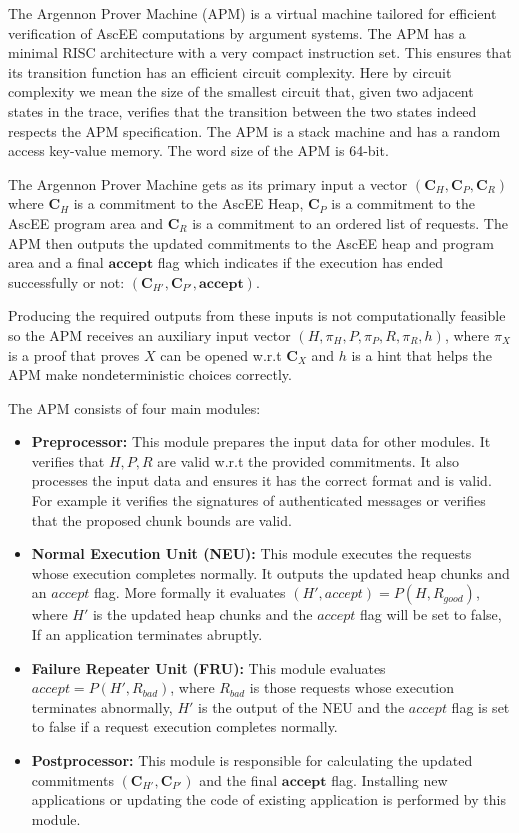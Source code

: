 
The Argennon Prover Machine (APM) is a virtual machine tailored for efficient verification of AscEE computations by
argument systems. The APM has a minimal RISC architecture with a very compact instruction set. This ensures that
its transition function has an efficient circuit complexity. Here by circuit complexity we mean the size
of the smallest circuit that, given two adjacent states in the trace, verifies that the transition between the two
states indeed respects the APM specification. The APM is a stack machine and has a random access key-value memory.
The word size of the APM is 64-bit.

The Argennon Prover Machine gets as its primary input a vector $(\mathbf{C}_H,\mathbf{C}_P,\mathbf{C}_R)$ where
$\mathbf{C}_H$ is a commitment to the AscEE Heap, $\mathbf{C}_P$ is a commitment to the AscEE program area and
$\mathbf{C}_R$ is a commitment to an ordered list of requests. The APM then outputs the updated
commitments to the AscEE heap and program area and a final $\mathbf{accept}$ flag which indicates if the execution has
ended successfully or not: $(\mathbf{C}_{H'},\mathbf{C}_{P'},\mathbf{accept})$.

Producing the required outputs from these inputs is not computationally feasible so the APM receives an auxiliary
input vector $(H,\pi_H,P,\pi_P,R,\pi_R,h)$, where $\pi_X$ is a proof that proves $X$ can be opened w.r.t
$\mathbf{C}_X$ and $h$ is a hint that helps the APM make nondeterministic choices correctly.

The APM consists of four main modules:
\begin{itemize}
    \item \textbf{Preprocessor:} This module prepares the input data for other modules. It verifies that $H,
    P,R$ are valid w.r.t the provided commitments. It also processes the input data and ensures it has the
    correct format and is valid. For example it verifies the signatures of authenticated messages or
    verifies that the proposed chunk bounds are valid.
    \item \textbf{Normal Execution Unit (NEU):} This module executes the requests whose execution completes
    normally. It outputs the updated heap chunks and an $accept$ flag. More formally it evaluates $(H',accept)=P(H,
    R_{good})$, where $H'$ is the updated heap chunks and the $accept$ flag will be set to false, If an
    application terminates abruptly.
    \item \textbf{Failure Repeater Unit (FRU):} This module evaluates $accept=P(H',R_{bad})$, where $R_{bad}$ is
    those requests whose execution terminates abnormally, $H'$ is the output of the NEU and the $accept$ flag is set
    to false if a request execution completes normally.
    \item \textbf{Postprocessor:} This module is responsible for calculating the updated commitments
    $(\mathbf{C}_{H'}, \mathbf{C}_{P'})$ and the final $\mathbf{accept}$ flag. Installing new applications or
    updating the code of existing application is performed by this module.
\end{itemize}


